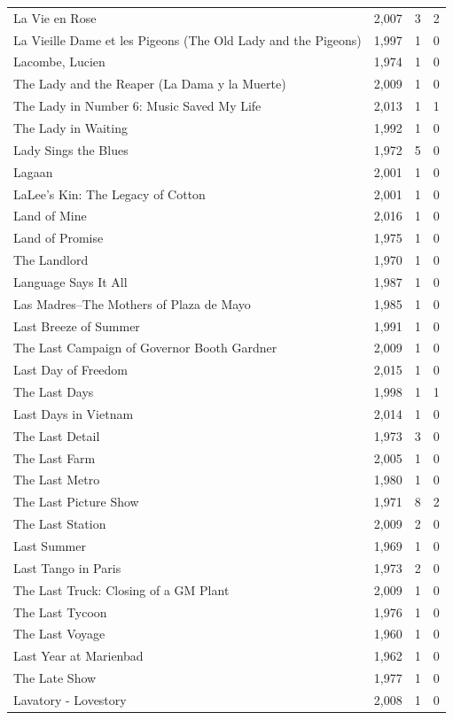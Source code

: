 \begin{tabular}{lrrr}
La Vie en Rose & 2,007 & 3 & 2 \\
La Vieille Dame et les Pigeons (The Old Lady and the Pigeons) & 1,997 & 1 & 0 \\
Lacombe, Lucien & 1,974 & 1 & 0 \\
The Lady and the Reaper (La Dama y la Muerte) & 2,009 & 1 & 0 \\
The Lady in Number 6: Music Saved My Life & 2,013 & 1 & 1 \\
The Lady in Waiting & 1,992 & 1 & 0 \\
Lady Sings the Blues & 1,972 & 5 & 0 \\
Lagaan & 2,001 & 1 & 0 \\
LaLee's Kin: The Legacy of Cotton & 2,001 & 1 & 0 \\
Land of Mine & 2,016 & 1 & 0 \\
Land of Promise & 1,975 & 1 & 0 \\
The Landlord & 1,970 & 1 & 0 \\
Language Says It All & 1,987 & 1 & 0 \\
Las Madres--The Mothers of Plaza de Mayo & 1,985 & 1 & 0 \\
Last Breeze of Summer & 1,991 & 1 & 0 \\
The Last Campaign of Governor Booth Gardner & 2,009 & 1 & 0 \\
Last Day of Freedom & 2,015 & 1 & 0 \\
The Last Days & 1,998 & 1 & 1 \\
Last Days in Vietnam & 2,014 & 1 & 0 \\
The Last Detail & 1,973 & 3 & 0 \\
The Last Farm & 2,005 & 1 & 0 \\
The Last Metro & 1,980 & 1 & 0 \\
The Last Picture Show & 1,971 & 8 & 2 \\
The Last Station & 2,009 & 2 & 0 \\
Last Summer & 1,969 & 1 & 0 \\
Last Tango in Paris & 1,973 & 2 & 0 \\
The Last Truck: Closing of a GM Plant & 2,009 & 1 & 0 \\
The Last Tycoon & 1,976 & 1 & 0 \\
The Last Voyage & 1,960 & 1 & 0 \\
Last Year at Marienbad & 1,962 & 1 & 0 \\
The Late Show & 1,977 & 1 & 0 \\
Lavatory - Lovestory & 2,008 & 1 & 0 \\

\end{tabular}
